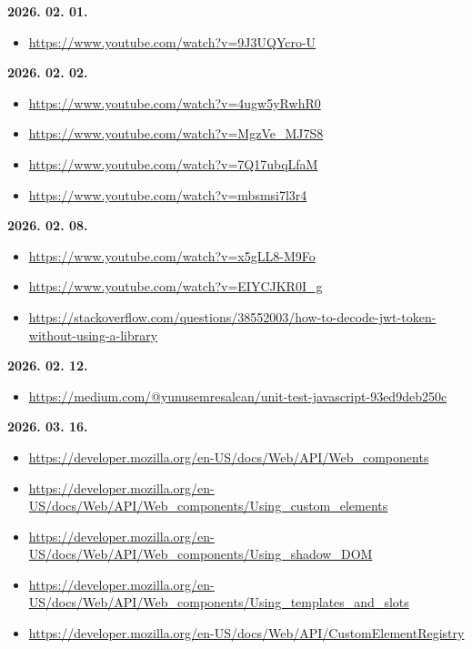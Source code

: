 \documentclass[12pt]{report}
\begin{document}
\noindent\textbf{2026. 02. 01.}
\begin{itemize}[left=0pt, topsep=0pt]
    \item \url{https://www.youtube.com/watch?v=9J3UQYcro-U}
\end{itemize}

\noindent\textbf{2026. 02. 02.}
\begin{itemize}[left=0pt, topsep=0pt]
    \item \url{https://www.youtube.com/watch?v=4ugw5yRwhR0}
    \item \url{https://www.youtube.com/watch?v=MgzVe_MJ7S8}
    \item \url{https://www.youtube.com/watch?v=7Q17ubqLfaM}
    \item \url{https://www.youtube.com/watch?v=mbsmsi7l3r4}
\end{itemize}

\noindent\textbf{2026. 02. 08.}
\begin{itemize}[left=0pt, topsep=0pt]
    \item \url{https://www.youtube.com/watch?v=x5gLL8-M9Fo}
    \item \url{https://www.youtube.com/watch?v=EIYCJKR0I_g}
    \item \url{https://stackoverflow.com/questions/38552003/how-to-decode-jwt-token-without-using-a-library}
\end{itemize}

\noindent\textbf{2026. 02. 12.}
\begin{itemize}[left=0pt, topsep=0pt]
    \item \url{https://medium.com/@yunusemresalcan/unit-test-javascript-93ed9deb250c}
\end{itemize}

\noindent\textbf{2026. 03. 16.}
\begin{itemize}[left=0pt, topsep=0pt]
    \item \url{https://developer.mozilla.org/en-US/docs/Web/API/Web_components}
    \item \url{https://developer.mozilla.org/en-US/docs/Web/API/Web_components/Using_custom_elements}
    \item \url{https://developer.mozilla.org/en-US/docs/Web/API/Web_components/Using_shadow_DOM}
    \item \url{https://developer.mozilla.org/en-US/docs/Web/API/Web_components/Using_templates_and_slots}
    \item \url{https://developer.mozilla.org/en-US/docs/Web/API/CustomElementRegistry}
\end{itemize}
\end{document}
